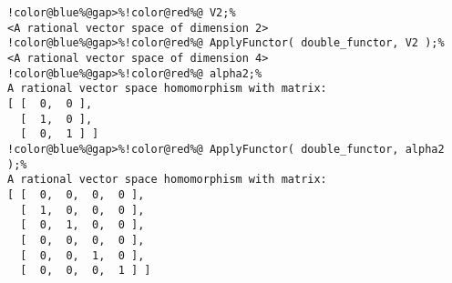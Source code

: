 \begin{Verbatim}[commandchars=!@\%,frame=single]
!color@blue%@gap>%!color@red%@ V2;%
<A rational vector space of dimension 2>
!color@blue%@gap>%!color@red%@ ApplyFunctor( double_functor, V2 );%
<A rational vector space of dimension 4>
!color@blue%@gap>%!color@red%@ alpha2;%
A rational vector space homomorphism with matrix:
[ [  0,  0 ],
  [  1,  0 ],
  [  0,  1 ] ]
!color@blue%@gap>%!color@red%@ ApplyFunctor( double_functor, alpha2 );%
A rational vector space homomorphism with matrix:
[ [  0,  0,  0,  0 ],
  [  1,  0,  0,  0 ],
  [  0,  1,  0,  0 ],
  [  0,  0,  0,  0 ],
  [  0,  0,  1,  0 ],
  [  0,  0,  0,  1 ] ]
\end{Verbatim}
